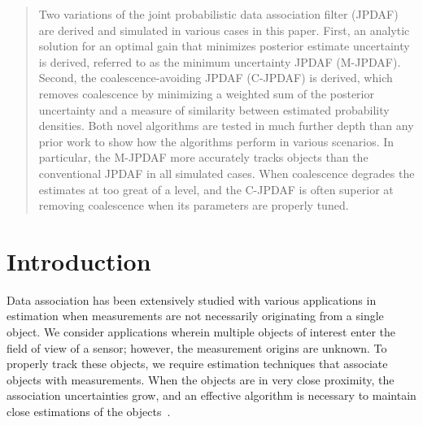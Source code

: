 \begin{abstract}
Two variations of the joint probabilistic data association filter (JPDAF) are derived and simulated in various cases in this paper.
First, an analytic solution for an optimal gain that minimizes posterior estimate uncertainty is derived, referred to as the minimum uncertainty JPDAF (M-JPDAF).
Second, the coalescence-avoiding JPDAF (C-JPDAF) is derived, which removes coalescence by minimizing a weighted sum of the posterior uncertainty and a measure of similarity between estimated probability densities.
Both novel algorithms are tested in much further depth than any prior work to show how the algorithms perform in various scenarios.
In particular, the M-JPDAF more accurately tracks objects than the conventional JPDAF in all simulated cases.
When coalescence degrades the estimates at too great of a level, and the C-JPDAF is often superior at removing coalescence when its parameters are properly tuned.
\end{abstract}

\section{Introduction}

Data association has been extensively studied with various applications in estimation when measurements are not necessarily originating from a single object.
We consider applications wherein multiple objects of interest enter the field of view of a sensor; however, the measurement origins are unknown.
To properly track these objects, we require estimation techniques that associate objects with measurements.
When the objects are in very close proximity, the association uncertainties grow, and an effective algorithm is necessary to maintain close estimations of the objects~\cite{KauLovLee14}.

